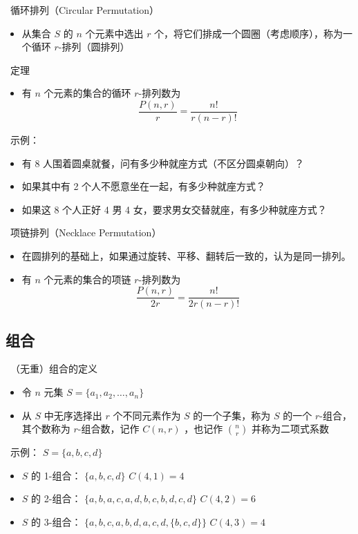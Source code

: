 \documentclass[UTF8]{report}
\theoremstyle{MyLineTheoremStyle} %
\theoremstyle{MyBlockTheoremStyle} %
\theoremstyle{MySubsubsectionStyle} %
\begin{document}
\textbullet\ 循环排列（Circular Permutation）
\begin{itemize}
    \item 从集合 $S$ 的 $n$ 个元素中选出 $r$ 个，将它们排成一个圆圈（考虑顺序），称为一个循环 $r$-排列（圆排列）
\end{itemize}

\textbullet\ 定理
\begin{itemize}
    \item 有 $n$ 个元素的集合的循环 $r$-排列数为
    \[
    \frac{P(n, r)}{r} = \frac{n!}{r (n - r)!}
    \]
\end{itemize}

\textbullet\ 示例：
\begin{itemize}
    \item 有 8 人围着圆桌就餐，问有多少种就座方式（不区分圆桌朝向）？
    \item 如果其中有 2 个人不愿意坐在一起，有多少种就座方式？
    \item 如果这 8 个人正好 4 男 4 女，要求男女交替就座，有多少种就座方式？
\end{itemize}

\textbullet\ 项链排列（Necklace Permutation）
\begin{itemize}
    \item 在圆排列的基础上，如果通过旋转、平移、翻转后一致的，认为是同一排列。
    \item 有 $n$ 个元素的集合的项链 $r$-排列数为
    \[
    \frac{P(n, r)}{2r} = \frac{n!}{2r (n - r)!}
    \]
\end{itemize}

\subsection{组合}
\textbullet\ （无重）组合的定义
\begin{itemize}
    \item 令 $n$ 元集 $S = \{a_1, a_2, \ldots , a_n\}$
    \item 从 $S$ 中无序选择出 $r$ 个不同元素作为 $S$ 的一个子集，称为 $S$ 的一个 $r$-组合，其个数称为 $r$-组合数，记作 $C(n, r)$ ，也记作 $\binom{n}{r}$ 并称为二项式系数
\end{itemize}

\textbullet\ 示例： $S = \{a, b, c, d\}$
\begin{itemize}
    \item $S$ 的 1-组合： $\{a , b , c , d\}$ $C(4,1) = 4$
    \item $S$ 的 2-组合： $\{a, b , a, c , a, d , b, c , b, d , c, d\}$ $C(4,2) = 6$
    \item $S$ 的 3-组合： $\{a, b, c , a, b, d , a, c, d , \{b, c, d\}\}$ $C(4,3) = 4$
\end{itemize}
\end{document}
